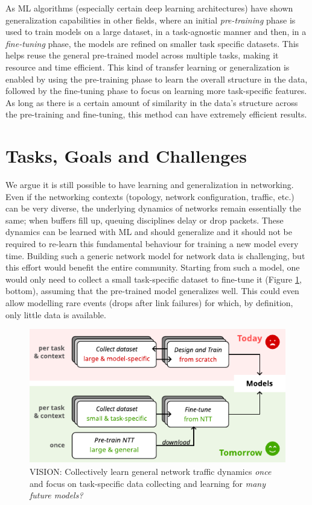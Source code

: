 As ML algorithms (especially certain deep learning architectures) have shown generalization capabilities\cite{generalizingdnn} in other fields, where an initial \emph{pre-training} phase is used to train models on a large dataset, in a task-agnostic manner and then, in a \emph{fine-tuning} phase, the models are refined on smaller task specific datasets. This helps reuse the general pre-trained model across multiple tasks, making it resource and time efficient. This kind of transfer learning or generalization\cite{transferng} is enabled by using the pre-training phase to learn the overall structure in the data, followed by the fine-tuning phase to focus on learning more task-specific features. As long as there is a certain amount of similarity in the data's structure across the pre-training and fine-tuning, this method can have extremely efficient results.

\section{Tasks, Goals and Challenges}
\label{sec:task}

We argue it is still possible to have learning and generalization in networking. Even if the networking contexts (topology, network configuration, traffic, etc.) can be very diverse, the underlying dynamics of networks remain essentially the same; \eg when buffers fill up, queuing disciplines delay or drop packets. These dynamics can be learned with ML and should generalize and it should not be required to re-learn this fundamental behaviour for training a new model every time. Building such a generic network model for network data is challenging, but this effort would benefit the entire community. Starting from such a model, one would only need to collect a small task-specific dataset to fine-tune it (Figure \ref{fig:vision}, bottom), assuming that the pre-trained model generalizes well. This could even allow modelling rare events (\eg drops after link failures) for which, by definition, only little data is available.

\begin{figure}
    \centering
    \includegraphics[scale=1.3]{figures/vision}
    \caption{VISION: Collectively learn general network traffic dynamics \emph{once} and focus on task-specific data collecting and learning  for \emph{many future models?}}
    \label{fig:vision}
\end{figure}

